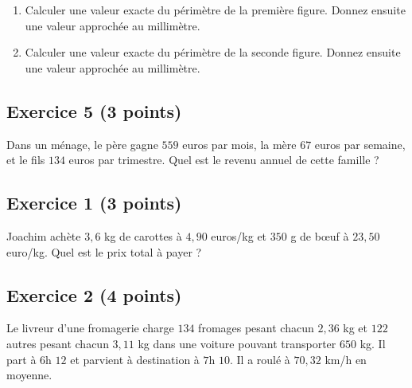 \documentclass[14pt]{extreport}
\theoremstyle{plain}
\begin{document}
\begin{figure}[H]
\center 
{}
\end{figure} 
\begin{enumerate}
\item Calculer une valeur exacte du périmètre de la première figure. Donnez ensuite une valeur approchée au millimètre. 

\item Calculer une valeur exacte du périmètre de la seconde figure. Donnez ensuite une valeur approchée au millimètre. 
\end{enumerate} 


\subsection*{Exercice 5 (3 points)}

Dans un ménage, le père gagne $559$ euros par mois, la mère $67$ euros par semaine, et le fils $134$ euros par trimestre. Quel est le revenu annuel de cette famille ?

\newpage



\subsection*{Exercice 1 (3 points)}

Joachim achète $3,6$ kg de carottes à $4,90$ euros/kg et $350$ g de bœuf à $23,50$ euro/kg. Quel est le prix total à payer ?

\subsection*{Exercice 2 (4 points)}

Le livreur d'une fromagerie charge $134$ fromages pesant chacun $2,36$ kg
et $122$ autres pesant chacun $3,11$ kg dans une voiture pouvant transporter $650$ kg. Il part à $6$h $12$ et parvient à destination à $7$h $10$. Il a roulé à $70,32$ km/h en moyenne. 
\end{document}
